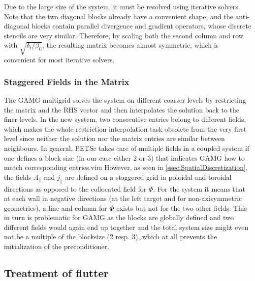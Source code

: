Due to the large size of the system, it must be resolved using iterative solvers. Note that the two diagonal blocks already have a convenient shape, and the anti-diagonal blocks contain parallel divergence and gradient operators, whose discrete stencils are very similar. Therefore, by scaling both the second column and row with $\sqrt{\delta_t / \beta_0}$, the resulting matrix becomes almost symmetric, which is convenient for most iterative solvers.


\subsubsection{Staggered Fields in the Matrix}
\label{ssec:StaggeredFieldsMatrix}
The GAMG multigrid solves the system on different coarser levels by restricting the matrix and the RHS vector and then interpolates the solution back to the finer levels. In the new system, two consecutive entries belong to different fields, which makes the whole restriction-interpolation task obsolete from the very first level since neither the solution nor the matrix entries are similar between neighbours. In general, PETSc takes care of multiple fields in a coupled system if one defines a block size (in our case either 2 or 3) that indicates GAMG how to match corresponding entries.vim  However, as seen in \autoref{ssec:SpatialDiscretization}, the fields $A_\parallel$ and $j_\parallel$ are defined on a staggered grid in poloidal and toroidal directions as opposed to the collocated field for $\Phi$. For the system it means that at each wall in negative directions (at the left target and for non-axisymmetric geometries), a line and column for $\Phi$ exists but not for the two other fields. This in turn is problematic for GAMG as the blocks are globally defined and two different fields would again end up together and the total system size might even not be a multiple of the blocksize (2 resp. 3), which at all prevents the initialization of the preconditioner. \\


\subsection{Treatment of flutter}

